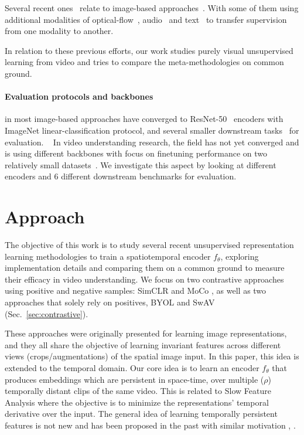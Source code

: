 \documentclass[final]{cvpr}
\newcommand{\sref}[1]{Sec.~\ref{#1}}
\begin{document}
	Several recent ones~\cite{Gordon20,Han20,Alwassel19,Patrick20,alayrac2020self,Qian20,yang2020video,morgado2020audio} relate to image-based approaches~\cite{He20,Caron18,Chen20,Wu18}.
	With some of them using additional modalities of optical-flow~\cite{Tian20,Han20}, audio~\cite{Alwassel19,Patrick20,alayrac2020self,morgado2020audio} and text~\cite{Sun19,alayrac2020self} to transfer supervision from one modality to another.  
	
	In relation to these previous efforts, our work studies purely visual unsupervised learning from video and tries to compare the meta-methodologies on common ground.
	
	\paragraph{Evaluation protocols and backbones} in most image-based approaches have converged to ResNet-50~\cite{He16} encoders with ImageNet linear-classification protocol, and several smaller downstream tasks~\cite{He20, Chen20, Grill2020, Caron20} for evaluation. ~ In video understanding research, the field has not yet converged and is using different backbones with focus on finetuning performance on two relatively small datasets~\cite{Soomro12,Kuehne11}. We investigate this aspect by looking at different encoders and 6 different downstream benchmarks for evaluation.
	
	\section{Approach} \label{sec:approach}
	The objective of this work is to study several recent unsupervised representation learning methodologies to train a spatiotemporal encoder $f_\theta$, exploring implementation details and comparing them on a common ground to measure their efficacy in video understanding. We focus on two contrastive approaches using positive and negative samples: SimCLR \cite{Chen20} and MoCo \cite{He20}, as well as two approaches that solely rely on  positives, BYOL \cite{Grill2020} and  SwAV \cite{Caron20}  (\sref{sec:contrastive}).
	
	These approaches were originally presented for learning image representations, and they all share the objective of learning invariant features across different views (crops/augmentations) of the spatial image input. In this paper, this idea is extended to the temporal domain. 
	Our core idea is to learn an encoder $f_\theta$ that produces embeddings  which are persistent in space-time, over multiple ($\rho$) temporally distant clips of the same video. This is related to Slow Feature Analysis \cite{Wiskott02} where the objective is to minimize the representations' temporal derivative over the input. The general idea of learning temporally persistent features is not new and has been proposed in the past with similar motivation \eg, \cite{Becker97, Mobahi09, goroshin2015unsupervised}.
	
\end{document}
